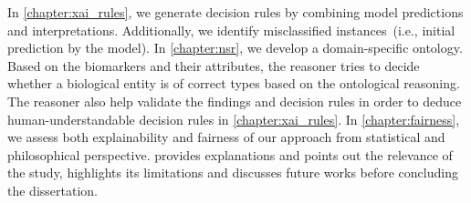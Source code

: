 \hspace*{3.5mm} In \cref{chapter:xai_rules}, we generate decision rules by combining model predictions and interpretations. Additionally, we identify  misclassified instances~(i.e., initial prediction by the model). In \cref{chapter:nsr}, we develop a  domain-specific ontology. Based on the biomarkers and their attributes, the reasoner tries to decide whether a biological entity is of correct types based on the ontological reasoning. The reasoner also help validate the findings and decision rules in order to deduce human-understandable decision rules in \cref{chapter:xai_rules}. In \cref{chapter:fairness}, we assess both explainability and fairness of our approach from statistical and philosophical perspective.  provides explanations and points out the relevance of the study, highlights its limitations and discusses future works before concluding the dissertation. 


